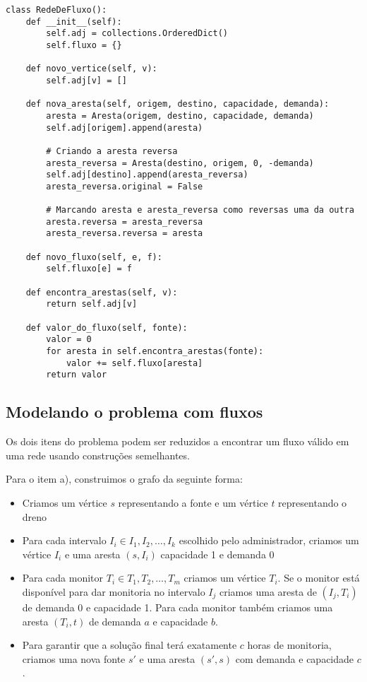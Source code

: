 \documentclass[11pt]{article}
\begin{document}
\begin{verbatim}
class RedeDeFluxo():
    def __init__(self):
        self.adj = collections.OrderedDict()
        self.fluxo = {}

    def novo_vertice(self, v):
        self.adj[v] = []

    def nova_aresta(self, origem, destino, capacidade, demanda):
        aresta = Aresta(origem, destino, capacidade, demanda)
        self.adj[origem].append(aresta)

        # Criando a aresta reversa
        aresta_reversa = Aresta(destino, origem, 0, -demanda)
        self.adj[destino].append(aresta_reversa)
        aresta_reversa.original = False

        # Marcando aresta e aresta_reversa como reversas uma da outra
        aresta.reversa = aresta_reversa
        aresta_reversa.reversa = aresta

    def novo_fluxo(self, e, f):
        self.fluxo[e] = f

    def encontra_arestas(self, v):
        return self.adj[v]

    def valor_do_fluxo(self, fonte):
        valor = 0
        for aresta in self.encontra_arestas(fonte):
            valor += self.fluxo[aresta]
        return valor
\end{verbatim}

\subsection{Modelando o problema com fluxos\label{modelagem_fluxo}}
\label{sec-2-3}

Os dois itens do problema podem ser reduzidos a encontrar um fluxo
válido em uma rede usando construções semelhantes.

Para o item a), construimos o grafo da seguinte forma:

\begin{itemize}
\item Criamos um vértice $s$ representando a fonte e um vértice $t$
  representando o dreno
\item Para cada intervalo $I_i \in I_1, I_2, \ldots, I_k$ escolhido pelo
administrador, criamos um vértice $I_i$ e uma aresta $(s, I_i)$
capacidade 1 e demanda 0
\item Para cada monitor $T_i \in T_1, T_2, \ldots, T_m$ criamos um vértice
$T_i$. Se o monitor está disponível para dar monitoria no intervalo
$I_j$ criamos uma aresta de $(I_j, T_i)$ de demanda 0 e
capacidade 1. Para cada monitor também criamos uma aresta
$(T_i, t)$ de demanda $a$ e capacidade $b$.
\item Para garantir que a solução final terá exatamente $c$ horas de
monitoria, criamos uma nova fonte $s'$ e uma aresta $(s', s)$
com demanda e capacidade $c$.
\end{itemize}
\end{document}
